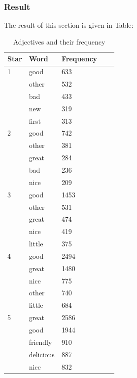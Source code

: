 \documentclass[sigconf]{acmart}
\begin{document}
\subsubsection{Result} The result of this section is given in Table:

\begin{table}
  \caption{Adjectives and their frequency}
  \label{tab:adj1}
  \begin{tabular}{lllll}
    \toprule
    Star & Word & Frequency \\
    \midrule
    1 & good & 633 \\
    & other & 532 \\
    & bad & 433 \\
    & new & 319 \\
    & first & 313 \\
    2 & good & 742 \\
    & other & 381 \\
    & great & 284 \\ 
    & bad & 236 \\
    & nice & 209 \\
    3 & good & 1453\\
    & other & 531 \\
    & great & 474 \\ 
    & nice & 419 \\ 
    & little & 375 \\
    4 & good & 2494 \\
    & great & 1480 \\ 
    & nice & 775 \\
    & other & 740 \\
    & little & 684 \\
    5 & great & 2586\\
    & good & 1944\\
    & friendly & 910\\
    & delicious & 887\\
    & nice & 832 \\
\end{tabular}
\end{table}
\end{document}
